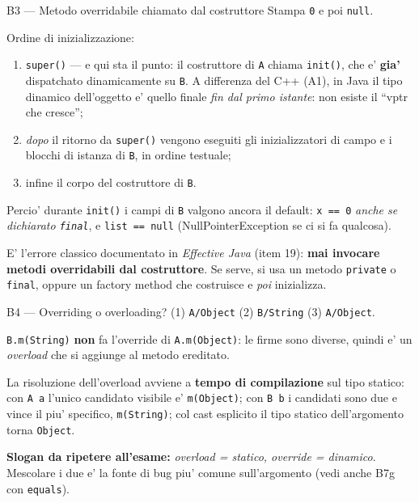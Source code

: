 \documentclass{report}
\newcommand{\code}[1]{\texttt{\small #1}}
\begin{document}
\begin{soluzione}{B3 --- Metodo overridabile chiamato dal costruttore}
\label{sol:B3}
Stampa \code{0} e poi \code{null}.

Ordine di inizializzazione:
\begin{enumerate}
    \item \code{super()} --- e qui sta il punto: il costruttore di \code{A}
          chiama \code{init()}, che e' \textbf{gia'} dispatchato dinamicamente
          su \code{B}. A differenza del C++ (A1), in Java il tipo dinamico
          dell'oggetto e' quello finale \emph{fin dal primo istante}: non
          esiste il ``vptr che cresce'';
    \item \emph{dopo} il ritorno da \code{super()} vengono eseguiti gli
          inizializzatori di campo e i blocchi di istanza di \code{B}, in ordine
          testuale;
    \item infine il corpo del costruttore di \code{B}.
\end{enumerate}
Percio' durante \code{init()} i campi di \code{B} valgono ancora il default:
\code{x == 0} \emph{anche se dichiarato \code{final}}, e \code{list == null}
(NullPointerException se ci si fa qualcosa).

E' l'errore classico documentato in \emph{Effective Java} (item 19):
\textbf{mai invocare metodi overridabili dal costruttore}. Se serve, si usa un
metodo \code{private} o \code{final}, oppure un factory method che costruisce e
\emph{poi} inizializza.
\end{soluzione}

\begin{soluzione}{B4 --- Overriding o overloading?}
\label{sol:B4}
(1) \code{A/Object} \quad (2) \code{B/String} \quad (3) \code{A/Object}.

\code{B.m(String)} \textbf{non} fa l'override di \code{A.m(Object)}: le firme
sono diverse, quindi e' un \emph{overload} che si aggiunge al metodo ereditato.

La risoluzione dell'overload avviene a \textbf{tempo di compilazione} sul tipo
statico: con \code{A a} l'unico candidato visibile e' \code{m(Object)}; con
\code{B b} i candidati sono due e vince il piu' specifico, \code{m(String)}; col
cast esplicito il tipo statico dell'argomento torna \code{Object}.

\textbf{Slogan da ripetere all'esame:} \emph{overload = statico, override =
dinamico}. Mescolare i due e' la fonte di bug piu' comune sull'argomento (vedi
anche B7g con \code{equals}).
\end{soluzione}
\end{document}
